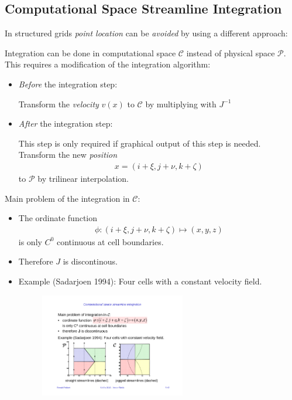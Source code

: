 \subsection{Computational Space Streamline Integration}
In structured grids \emph{point location} can be \emph{avoided} by using a different approach:

Integration can be done in computational space $\mathcal C$ instead of physical space $\mathcal P$. This requires a modification of the integration algorithm:

\begin{itemize}
    \item \emph{Before} the integration step:
    
    Transform the \emph{velocity} $v(x)$ to $\mathcal C$ by multiplying with $J^{-1}$
    \item \emph{After} the integration step:
    
    This step is only required if graphical output of this step is needed. Transform the new \emph{position}
    \begin{align*}
         x= (i+\xi, j+\nu, k+\zeta)
    \end{align*}
    to $\mathcal P$ by trilinear interpolation.
\end{itemize}

Main problem of the integration in $\mathcal C$:
\begin{itemize}
    \item The ordinate function
    \begin{align*}
        \phi: (i+\xi,j+\nu, k+\zeta) \mapsto (x,y,z)
    \end{align*}
    is only $C^0$ continuous at cell boundaries.
    \item Therefore $J$ is discontinous.
    
    \item Example (Sadarjoen 1994): Four cells with a constant velocity field.
    \begin{figure}[H]
        \centering
        \includegraphics[width=0.6\textwidth]{img/05_cspace_integration_problem}
    \end{figure}
\end{itemize}

